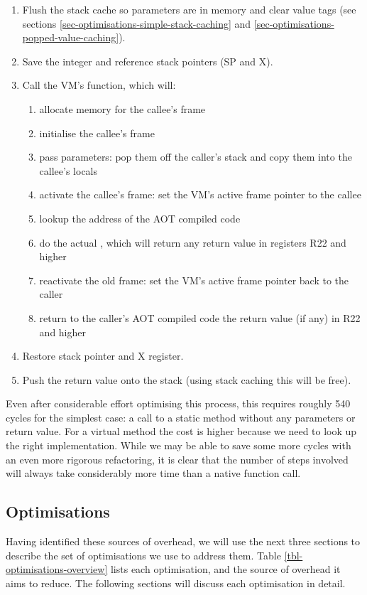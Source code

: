 \begin{enumerate}
  \small
  \item Flush the stack cache so parameters are in memory and clear value tags (see sections \ref{sec-optimisations-simple-stack-caching} and \ref{sec-optimisations-popped-value-caching}).
  \item Save the integer and reference stack pointers (SP and X).
  \item Call the VM's  function, which will:
  \begin{enumerate}
    \item allocate memory for the callee's frame
    \item initialise the callee's frame
    \item pass parameters: pop them off the caller's stack and copy them into the callee's locals
    \item activate the callee's frame: set the VM's active frame pointer to the callee
    \item lookup the address of the AOT compiled code
    \item do the actual , which will return any return value in registers R22 and higher
    \item reactivate the old frame: set the VM's active frame pointer back to the caller
    \item return to the caller's AOT compiled code the return value (if any) in R22 and higher
  \end{enumerate}
  \item Restore stack pointer and X register.
  \item Push the return value onto the stack (using stack caching this will be free).
\end{enumerate}

Even after considerable effort optimising this process, this requires roughly 540 cycles for the simplest case: a call to a static method without any parameters or return value. For a virtual method the cost is higher because we need to look up the right implementation. While we may be able to save some more cycles with an even more rigorous refactoring, it is clear that the number of steps involved will always take considerably more time than a native function call.

\subsection{Optimisations}
\label{sec-optimisations-java-source}
Having identified these sources of overhead, we will use the next three sections to describe the set of optimisations we use to address them. Table \ref{tbl-optimisations-overview} lists each optimisation, and the source of overhead it aims to reduce. The following sections will discuss each optimisation in detail.

